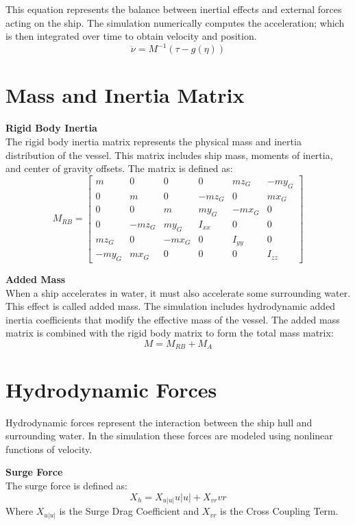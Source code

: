 \documentclass[12pt,a4paper]{report}
\begin{document}
This equation represents the balance between inertial effects and external forces acting on the ship. The simulation numerically computes the acceleration; which is then integrated over time to obtain velocity and position.
\begin{equation}
    \dot{\nu} = M^{-1} (\tau - g(\eta))
\end{equation}

\section{Mass and Inertia Matrix}
\textbf{Rigid Body Inertia} \\
The rigid body inertia matrix represents the physical mass and inertia distribution of the vessel. This matrix includes ship mass, moments of inertia, and center of gravity offsets. The matrix is defined as:
\begin{equation}
    M_{RB} = \begin{bmatrix}
    m & 0 & 0 & 0 & m z_G & -m y_G \\
    0 & m & 0 & -m z_G & 0 & m x_G \\
    0 & 0 & m & m y_G & -m x_G & 0 \\
    0 & -m z_G & m y_G & I_{xx} & 0 & 0 \\
    m z_G & 0 & -m x_G & 0 & I_{yy} & 0 \\
    -m y_G & m x_G & 0 & 0 & 0 & I_{zz}
    \end{bmatrix}
\end{equation}

\textbf{Added Mass} \\
When a ship accelerates in water, it must also accelerate some surrounding water. This effect is called added mass. The simulation includes hydrodynamic added inertia coefficients that modify the effective mass of the vessel. The added mass matrix is combined with the rigid body matrix to form the total mass matrix:
\begin{equation}
    M = M_{RB} + M_A
\end{equation}

\section{Hydrodynamic Forces}
Hydrodynamic forces represent the interaction between the ship hull and surrounding water. In the simulation these forces are modeled using nonlinear functions of velocity.

\textbf{Surge Force} \\
The surge force is defined as:
\begin{equation}
    X_h = X_{u|u|} u|u| + X_{vr} vr
\end{equation}
Where $X_{u|u|}$ is the Surge Drag Coefficient and $X_{vr}$ is the Cross Coupling Term.
\end{document}
